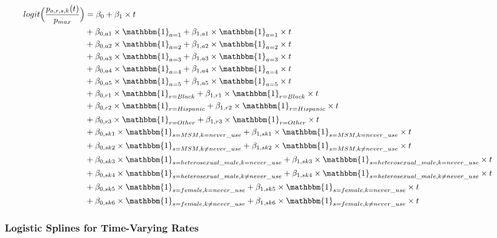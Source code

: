 \documentclass{article}
\begin{document}
\begin{align*}
logit\Big(\frac{p_{a,r,s,k}(t)}{p_{max}}\Big) &= \beta_0 + \beta_1 \times t \\
&+ \beta_{0,a1} \times \mathbbm{1}_{a=1} + \beta_{1,a1} \times \mathbbm{1}_{a=1} \times t \\
&+ \beta_{0,a2} \times \mathbbm{1}_{a=2} + \beta_{1,a2} \times \mathbbm{1}_{a=2} \times t \\
&+ \beta_{0,a3} \times \mathbbm{1}_{a=3} + \beta_{1,a3} \times \mathbbm{1}_{a=3} \times t \\
&+ \beta_{0,a4} \times \mathbbm{1}_{a=4} + \beta_{1,a4} \times \mathbbm{1}_{a=4} \times t \\
&+ \beta_{0,a5} \times \mathbbm{1}_{a=5} + \beta_{1,a5} \times \mathbbm{1}_{a=5} \times t \\
&+ \beta_{0,r1} \times \mathbbm{1}_{r=Black} + \beta_{1,r1} \times \mathbbm{1}_{r=Black} \times t \\
&+ \beta_{0,r2} \times \mathbbm{1}_{r=Hispanic} + \beta_{1,r2} \times \mathbbm{1}_{r=Hispanic} \times t \\
&+ \beta_{0,r3} \times \mathbbm{1}_{r=Other} + \beta_{1,r3} \times \mathbbm{1}_{r=Other} \times t \\
&+ \beta_{0,sk1} \times \mathbbm{1}_{s=MSM,k=never\_use} + \beta_{1,sk1} \times \mathbbm{1}_{s=MSM,k=never\_use} \times t \\
&+ \beta_{0,sk2} \times \mathbbm{1}_{s=MSM,k\neq never\_use} + \beta_{1,sk2} \times \mathbbm{1}_{s=MSM,k\neq never\_use} \times t \\
&+ \beta_{0,sk3} \times \mathbbm{1}_{s=heterosexual\_male,k=never\_use} + \beta_{1,sk3} \times \mathbbm{1}_{s=heterosexual\_male,k=never\_use} \times t \\
&+ \beta_{0,sk4} \times \mathbbm{1}_{s=heterosexual\_male,k\neq never\_use} + \beta_{1,sk4} \times \mathbbm{1}_{s=heterosexual\_male,k\neq never\_use} \times t \\
&+ \beta_{0,sk5} \times \mathbbm{1}_{s=female,k=never\_use} + \beta_{1,sk5} \times \mathbbm{1}_{s=female,k=never\_use} \times t \\
&+ \beta_{0,sk6} \times \mathbbm{1}_{s=female,k\neq never\_use} + \beta_{1,sk6} \times \mathbbm{1}_{s=female,k\neq never\_use} \times t
\end{align*}

\subsubsection{Logistic Splines for Time-Varying Rates}\label{logistic_splines}
\end{document}
